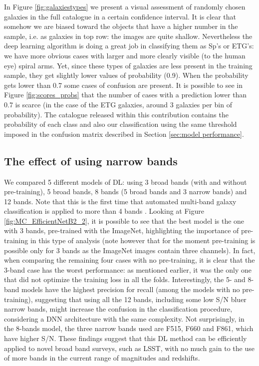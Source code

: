 \documentclass[fleqn,usenatbib]{mnras}
\begin{document}
In Figure \ref{fig:galaxiestypes} we present a visual assessment of randomly chosen galaxies in the full catalogue in a certain confidence interval. It is clear that somehow we are biased toward the objects that have a higher number in the sample, i.e. as galaxies in top row: the images are quite shallow. Nevertheless  the deep learning algorithm is doing a great job in classifying them as Sp's or ETG's: we have more obvious cases with larger and more clearly visible (to the  human eye) spiral arms. Yet, since these types of galaxies are less present in the training sample, they get  slightly lower values of probability (0.9). When the probability gets lower than 0.7 some cases of confusion are present. It is  possible to see in Figure \ref{fig:scores_probs} that the number of cases with a prediction lower than 0.7 is scarce (in the case of the ETG galaxies, around 3 galaxies per bin of probability). The catalogue released within this contribution contains the probability of each class and also our classification using the same threshold imposed in the confusion matrix described in Section \ref{sec:model performance}.


 
 \subsection{The effect of using narrow bands}
 
 We compared 5 different models of DL: using 3 broad bands (with and without pre-training), 5 broad bands, 8 bands (5 broad bands and 3 narrow bands) and 12 bands. Note that this is the first time that automated multi-band galaxy classification is applied to more than 4 bands \citep{Vega-Ferrero2020}.
 Looking at Figure \ref{fig:MC_EfficientNetB2_2}, it is possible to see that the best model is the one with 3 bands, pre-trained with the ImageNet, highlighting the importance of pre-training in this type of analysis (note however that for the  moment pre-training is possible only for 3 bands as the ImageNet images contain three channels). In fact, when comparing the remaining four cases with no pre-training, it is clear that the 3-band case has the worst performance: as mentioned earlier, it was the only one that did not optimize the training loss in all the folds. Interestingly, the 5- and 8-band models have the highest precision for recall (among the models with no pre-training), suggesting that using all the 12 bands, including some low  S/N bluer narrow bands, might increase the confusion in the classification procedure, considering a DNN architecture with the same complexity.  Not surprisingly, in the 8-bands model, the three narrow bands used are F515, F660 and F861, which have higher S/N.
 These findings suggest that this DL method can be efficiently applied to novel broad band surveys, such as LSST, with no much gain to the use of more bands in the current range of magnitudes and redshifts.
 
\end{document}
